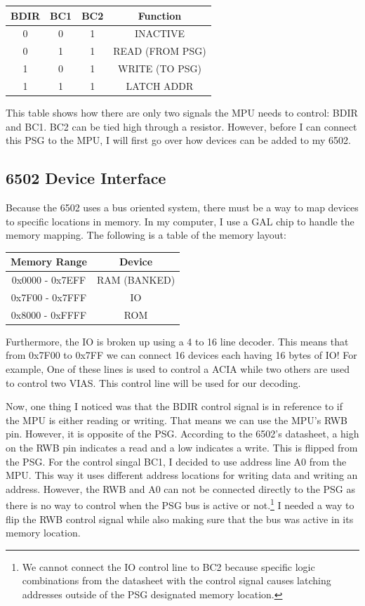 \documentclass[12pt, letterpaper]{article}
\begin{document}
\begin{center}
 \begin{tabular}{||c c c c||} 
 \hline
 BDIR & BC1 & BC2 & Function \\ [0.5ex] 
 \hline\hline
 0 & 0 & 1 & INACTIVE \\ 
 \hline
 0 & 1 & 1 & READ (FROM PSG) \\
 \hline
 1 & 0 & 1 & WRITE (TO PSG)\\
 \hline
 1 & 1 & 1 & LATCH ADDR \\
 \hline
\end{tabular}
\end{center}

This table shows how there are only two signals the MPU needs to control: BDIR and BC1. BC2 can be tied high through a resistor. However, before I can connect this PSG to the MPU, I will first go over how devices can be added to my 6502.

\subsection{6502 Device Interface}

Because the 6502 uses a bus oriented system, there must be a way to map devices to specific locations in memory. In my computer, I use a GAL chip to handle the memory mapping. The following is a table of the memory layout:


\begin{center}
\begin{tabular}{||c c||} 
 \hline
 Memory Range & Device \\ [0.5ex] 
 \hline\hline
 0x0000 - 0x7EFF & RAM (BANKED) \\ 
 \hline
 0x7F00 - 0x7FFF & IO \\
 \hline
 0x8000 - 0xFFFF & ROM \\
 \hline
\end{tabular}
\end{center}

Furthermore, the IO is broken up using a 4 to 16 line decoder. This means that from 0x7F00 to 0x7FF we can connect 16 devices each having 16 bytes of IO! For example, One of these lines is used to control a ACIA while two others are used to control two VIAS. This control line will be used for our decoding.
	
Now, one thing I noticed was that the BDIR control signal is in reference to if the MPU is either reading or writing. That means we can use the MPU's RWB pin. However, it is opposite of the PSG. According to the 6502's datasheet, a high on the RWB pin indicates a read and a low indicates a write. This is flipped from the PSG. For the control singal BC1, I decided to use address line A0 from the MPU. This way it uses different address locations for writing data and writing an address. However, the RWB and A0 can not be connected directly to the PSG as there is no way to control when the PSG bus is active or not.\footnote{We cannot connect the IO control line to BC2 because specific logic combinations from the datasheet with the control signal causes latching addresses outside of the PSG designated memory location.} I needed a way to flip the RWB control signal while also making sure that the bus was active in its memory location. 
\end{document}
